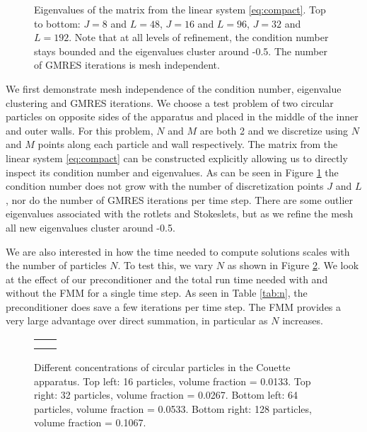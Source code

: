 \begin{figure}[!h]
\begin{center}

\caption[Eigenvalues for various levels of refinement.]{Eigenvalues of the matrix from the linear system \eqref{eq:compact}. Top to bottom: $J=8$ and $L=48$, $J=16$ and $L=96$, $J=32$ and $L=192$. Note that at all levels of refinement, the condition number stays bounded and the eigenvalues cluster around -0.5. The number of GMRES iterations is mesh independent.}
\end{center}\label{fig:eigenvalues}
\end{figure}

We first demonstrate mesh independence of the condition number, eigenvalue clustering and GMRES iterations. We choose a test problem of two circular particles on opposite sides of the apparatus and placed in the middle of the inner and outer walls. For this problem, $N$ and $M$ are both 2 and we discretize using $N$ and $M$ points along each particle and wall respectively. The matrix from the linear system \eqref{eq:compact} can be constructed explicitly allowing us to directly inspect its condition number and eigenvalues.  As can be seen in Figure \ref{fig:eigenvalues} the condition number does not grow with the number of discretization points $J$ and $L$, nor do the number of GMRES iterations per time step. There are some outlier eigenvalues associated with the rotlets and Stokeslets, but as we refine the mesh all new eigenvalues cluster around -0.5. 



We are also interested in how the time needed to compute solutions scales with the number of particles $N$. To test this, we vary $N$ as shown in Figure \ref{fig:couette_n}. We  look at the effect of our preconditioner and the total run time needed with and without the FMM for a single time step. As seen in Table \ref{tab:n}, the preconditioner does save a few iterations per time step. The FMM provides a very large advantage over direct summation, in particular as $N$ increases. 

\begin{figure}[!h]
\begin{center}
\begin{tabular}{c c}
 & \\
 & \\
\end{tabular}
\caption[Couette apparatus with various numbers of circular particles.]{Different concentrations of circular particles in the Couette apparatus. Top left: 16 particles, volume fraction = 0.0133. Top right: 32 particles, volume fraction = 0.0267. Bottom left: 64 particles, volume fraction = 0.0533. Bottom right: 128 particles, volume fraction = 0.1067. }
\end{center}\label{fig:couette_n}
\end{figure}

